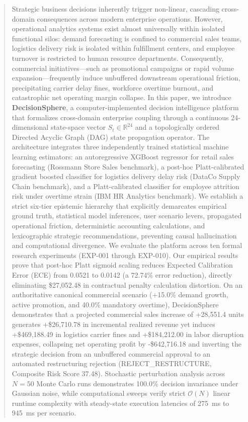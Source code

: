 \documentclass[journal]{IEEEtran}
\begin{document}
\begin{abstract}
Strategic business decisions inherently trigger non-linear, cascading cross-domain consequences across modern enterprise operations. However, operational analytics systems exist almost universally within isolated functional silos: demand forecasting is confined to commercial sales teams, logistics delivery risk is isolated within fulfillment centers, and employee turnover is restricted to human resource departments. Consequently, commercial initiatives---such as promotional campaigns or rapid volume expansion---frequently induce unbuffered downstream operational friction, precipitating carrier delay fines, workforce overtime burnout, and catastrophic net operating margin collapse. In this paper, we introduce \textbf{DecisionSphere}, a computer-implemented decision intelligence platform that formalizes cross-domain enterprise coupling through a continuous 24-dimensional state-space vector $S_t \in \mathbb{R}^{24}$ and a topologically ordered Directed Acyclic Graph (DAG) state propagation operator. The architecture integrates three independently trained statistical machine learning estimators: an autoregressive XGBoost regressor for retail sales forecasting (Rossmann Store Sales benchmark), a post-hoc Platt-calibrated gradient boosted classifier for logistics delivery delay risk (DataCo Supply Chain benchmark), and a Platt-calibrated classifier for employee attrition risk under overtime strain (IBM HR Analytics benchmark). We establish a strict six-tier epistemic hierarchy that explicitly demarcates empirical ground truth, statistical model inferences, user scenario levers, propagated operational friction, deterministic accounting calculations, and lexicographic strategic recommendations, preventing causal hallucination and computational divergence. We evaluate the platform across ten formal research experiments (EXP-001 through EXP-010). Our empirical results prove that post-hoc Platt sigmoid scaling reduces Expected Calibration Error (ECE) from 0.0521 to 0.0142 (a 72.74\% error reduction), directly eliminating \$27,052.48 in contractual penalty calculation distortion. On an authoritative canonical commercial scenario (+15.0\% demand growth, active promotion, and 40.0\% mandatory overtime), DecisionSphere demonstrates that a projected commercial sales increase of +28,551.4 units generates +\$26,710.78 in incremental realized revenue yet induces +\$469,188.49 in logistics carrier fines and +\$184,212.00 in labor disruption expenses, collapsing net operating profit by -\$642,716.18 and inverting the strategic decision from an unbuffered commercial approval to an automated restructuring rejection (REJECT\_RESTRUCTURE, Composite Risk Score 37.48). Stochastic perturbation analysis across $N=50$ Monte Carlo runs demonstrates 100.0\% decision invariance under Gaussian noise, while computational sweeps verify strict $\mathcal{O}(N)$ linear runtime complexity with steady-state execution latencies of 275~ms to 945~ms per scenario.
\end{abstract}
\end{document}
